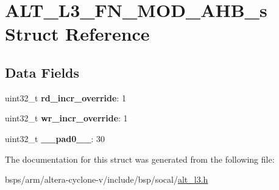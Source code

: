 \hypertarget{structALT__L3__FN__MOD__AHB__s}{}\section{A\+L\+T\+\_\+\+L3\+\_\+\+F\+N\+\_\+\+M\+O\+D\+\_\+\+A\+H\+B\+\_\+s Struct Reference}
\label{structALT__L3__FN__MOD__AHB__s}
\subsection*{Data Fields}
\begin{DoxyCompactItemize}
\item 
\mbox{\label{structALT__L3__FN__MOD__AHB__s_ab2cb44d6d6ccab2888c69992c8197402}} 
uint32\+\_\+t {\bfseries rd\+\_\+incr\+\_\+override}\+: 1
\item 
\mbox{\label{structALT__L3__FN__MOD__AHB__s_ae7319ca0e3dfd830ae8c3c934147fdd3}} 
uint32\+\_\+t {\bfseries wr\+\_\+incr\+\_\+override}\+: 1
\item 
\mbox{\label{structALT__L3__FN__MOD__AHB__s_a4b797a43b5df17010b6b5d8293240ed2}} 
uint32\+\_\+t {\bfseries \+\_\+\+\_\+pad0\+\_\+\+\_\+}\+: 30
\end{DoxyCompactItemize}


The documentation for this struct was generated from the following file\+:\begin{DoxyCompactItemize}
\item 
bsps/arm/altera-\/cyclone-\/v/include/bsp/socal/\mbox{\hyperlink{alt__l3_8h}{alt\+\_\+l3.\+h}}\end{DoxyCompactItemize}
